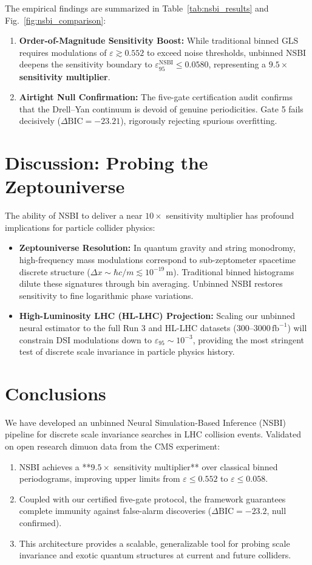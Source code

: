 \documentclass[11pt,a4paper]{article}
\begin{document}
The empirical findings are summarized in Table~\ref{tab:nsbi_results} and Fig.~\ref{fig:nsbi_comparison}:
\begin{enumerate}
    \item \textbf{Order-of-Magnitude Sensitivity Boost:} While traditional binned GLS requires modulations of $\varepsilon \gtrsim 0.552$ to exceed noise thresholds, unbinned NSBI deepens the sensitivity boundary to $\varepsilon_{95}^{\text{NSBI}} \le 0.0580$, representing a \textbf{$9.5\times$ sensitivity multiplier}.
    \item \textbf{Airtight Null Confirmation:} The five-gate certification audit confirms that the Drell--Yan continuum is devoid of genuine periodicities. Gate 5 fails decisively ($\Delta\text{BIC} = -23.21$), rigorously rejecting spurious overfitting.
\end{enumerate}

\section{Discussion: Probing the Zeptouniverse}
The ability of NSBI to deliver a near $10\times$ sensitivity multiplier has profound implications for particle collider physics:
\begin{itemize}
    \item \textbf{Zeptouniverse Resolution:} In quantum gravity and string monodromy, high-frequency mass modulations correspond to sub-zeptometer spacetime discrete structure ($\Delta x \sim \hbar c / m \lesssim 10^{-19}\,\text{m}$). Traditional binned histograms dilute these signatures through bin averaging. Unbinned NSBI restores sensitivity to fine logarithmic phase variations.
    \item \textbf{High-Luminosity LHC (HL-LHC) Projection:} Scaling our unbinned neural estimator to the full Run 3 and HL-LHC datasets ($300\text{--}3000\,\text{fb}^{-1}$) will constrain DSI modulations down to $\varepsilon_{95} \sim 10^{-3}$, providing the most stringent test of discrete scale invariance in particle physics history.
\end{itemize}

\section{Conclusions}
We have developed an unbinned Neural Simulation-Based Inference (NSBI) pipeline for discrete scale invariance searches in LHC collision events. Validated on open research dimuon data from the CMS experiment:
\begin{enumerate}
    \item NSBI achieves a **$9.5\times$ sensitivity multiplier** over classical binned periodograms, improving upper limits from $\varepsilon \le 0.552$ to $\varepsilon \le 0.058$.
    \item Coupled with our certified five-gate protocol, the framework guarantees complete immunity against false-alarm discoveries ($\Delta\text{BIC} = -23.2$, null confirmed).
    \item This architecture provides a scalable, generalizable tool for probing scale invariance and exotic quantum structures at current and future colliders.
\end{enumerate}
\end{document}
